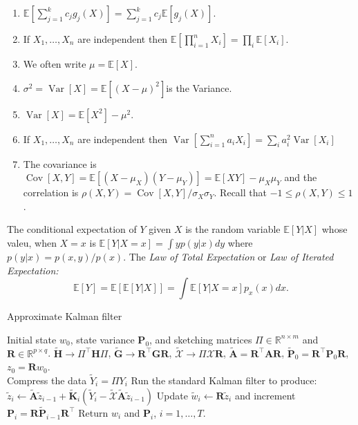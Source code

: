 \documentclass[10pt]{article}
\newcommand{\Expect}[1]{\mathbb{E}\!\left[#1\right]}
\newcommand{\R}{\mathbb{R}}
\newcommand{\X}{\mathcal{X}}
\DeclareMathOperator*{\Variance}{Var}
\newcommand{\Var}[1]{\Variance\!\left[#1\right]}
\DeclareMathOperator*{\Covariance}{Cov}
\newcommand{\Cov}[1]{\Covariance\!\left[#1\right]}
\begin{document}
\begin{enumerate}
\item $\Expect{\sum^k_{j=1} c_jg_j(X)} = \sum^k_{j=1} c_j\Expect{g_j(X)}.$
\item If $X_1, \ldots , X_n$ are independent then
    $\Expect{ \prod_{i=1}^n X_i } = \prod_i \Expect{X_i}$.
\item We often write $\mu = \Expect{X}$.
\item $\sigma^2 =\Var{X}=\Expect{(X-\mu)^2}$is the Variance.
\item $\Var{X}=\Expect{X^2}-\mu^2.$
\item If $X_1, \ldots , X_n$ are independent then
  $\Var{\sum_{i=1}^n a_i X_i} = \sum_i a_i^2\Var{X_i}$
\item The covariance is $\Cov{X,Y}=\Expect{(X-\mu_X)(Y -\mu_Y)}=\Expect{XY}-\mu_X\mu_Y$
and the correlation is $\rho(X,Y)=\Cov{X,Y}/\sigma_X\sigma_Y$. Recall
that $−1\leq \rho (X,Y)\leq1$.
\end{enumerate}

The conditional expectation of $Y$ given $X$ is the random variable
$\Expect{Y|X}$ whose valeu, when $X=x$ is $\Expect{Y|X=x} = \int y p(y|x) dy$
where $p(y|x) = p(x,y)/p(x)$. The {\em Law of Total Expectation} or
{\em Law of Iterated Expectation:}
\begin{equation}
  \label{eq:8}
  \Expect{Y} = \Expect{\Expect{Y|X}} = \int \Expect{Y|X=x}p_x(x)dx.
\end{equation}


\begin{algorithm}[t!]
  \caption{Approximate Kalman filter\label{alg:kalman}}
  \begin{algorithmic}[1]
  Initial state $w_0$, state variance $\mathbf{P}_0$,
    and sketching matrices $\Pi\in\R^{n\times m}$ and
    $\mathbf{R}\in\R^{p\times q}$.
   $\tilde{\mathbf{H}}\rightarrow\Pi^\top
  \mathbf{H} \Pi$, $\tilde{\mathbf{G}}\rightarrow \mathbf{R}^\top
  \mathbf{G}\mathbf{R}$, $\tilde{\X}\rightarrow \Pi\X\mathbf{R}$,
  $\tilde{\mathbf{A}} = \mathbf{R}^\top \mathbf{A} \mathbf{R}$,
  $\tilde{\mathbf{P}}_0 = \mathbf{R}^\top \mathbf{P}_0\mathbf{R}$,
  $z_0=\mathbf{R}w_0$. \\ 
    \STATE Compress the data $\tilde{Y}_i=\Pi Y_i$
    \STATE Run the standard Kalman filter to produce:
    $
    \tilde{z}_{i} \leftarrow
    \tilde{\mathbf{A}}\tilde{z}_{i-1}+\tilde{\mathbf{K}}_i(\tilde{Y}_i -
    \tilde{\X}\tilde{\mathbf{A}}\tilde{z}_{i-1}) 
    $
    \STATE Update 
    $\tilde{w}_i \leftarrow \mathbf{R}\tilde{z}_i$ and increment $\mathbf{P}_{i} = 
    \mathbf{R}\tilde{\mathbf{P}}_{i-1} \mathbf{R}^\top$\;
  \ENDFOR
  \STATE Return $w_i$ and $\mathbf{P}_i$, $i=1,\ldots,T$.
\end{algorithmic}
\end{algorithm}
\end{document}
